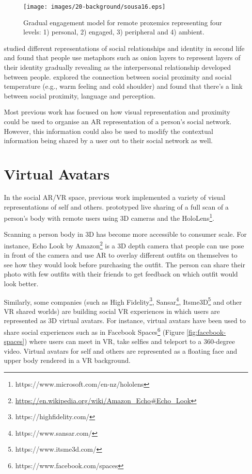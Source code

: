 \begin{figure}
    \centering
    \texttt{[image: images/20-background/sousa16.eps]}
    \caption{Gradual engagement model for remote proxemics representing four levels: 1) personal, 2) engaged, 3) peripheral and 4) ambient. \cite{Sousa2016}}
    \label{fig:Sousa2016}
\end{figure}

\textcite{Leshed2012} studied different representations of social relationships and identity in second life and found that people use metaphors such as onion layers to represent layers of their identity gradually revealing as the interpersonal relationship developed between people. \textcite{Hans2009} explored the connection between social proximity and social temperature (e.g., warm feeling and cold shoulder) and found that there's a link between social proximity, language and perception. 


Most previous work has focused on how visual representation and proximity could be used to organise an AR representation of a person's social network. However, this information could also be used to modify the contextual information being shared by a user out to their social network as well. 

\section{Virtual Avatars}

In the social AR/VR space, previous work implemented a variety of visual representations of self and others. \textcite{Fanello2016} prototyped live sharing of a full scan of a person's body with remote users using 3D cameras and the HoloLens\footnote{https://www.microsoft.com/en-nz/hololens}. 

Scanning a person body in 3D has become more accessible to consumer scale. For instance, Echo Look by Amazon\footnote{\url{https://en.wikipedia.org/wiki/Amazon\_Echo\#Echo\_Look}} is a 3D depth camera that people can use pose in front of the camera and use AR to overlay different outfits on themselves to see how they would look before purchasing the outfit. The person can share their photo with few outfits with their friends to get feedback on which outfit would look better. 

Similarly, some companies (such as High Fidelity\footnote{https://highfidelity.com/}, Sansar\footnote{https://www.sansar.com/}, Itsme3D\footnote{https://www.itsme3d.com/} and other VR shared worlds) are building social VR experiences in which users are represented as 3D virtual avatars. For instance, virtual avatars have been used to share social experiences such as in Facebook Spaces\footnote{https://www.facebook.com/spaces} (Figure \ref{fig:facebook-spaces}) where users can meet in VR, take selfies and teleport to a 360-degree video. Virtual avatars for self and others are represented as a floating face and upper body rendered in a VR background. 

